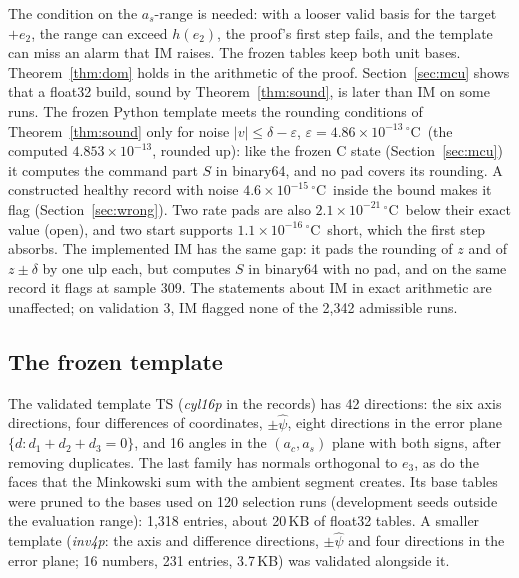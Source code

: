 \documentclass[11pt,a4paper]{article}
\newcommand{\degC}{\ensuremath{{}^\circ}C}
\newcommand{\sci}[2]{\ensuremath{#1\times10^{#2}}}
\begin{document}
The condition on the $a_s$-range is needed: with a looser valid basis for the target $+e_2$, the range can exceed
$h(e_2)$, the proof's first step fails, and the template can miss an alarm that IM raises. The frozen tables keep both
unit bases. Theorem~\ref{thm:dom} holds in the arithmetic of the proof. Section~\ref{sec:mcu} shows that a float32
build, sound by Theorem~\ref{thm:sound}, is later than IM on some runs. The frozen Python template meets the rounding
conditions of Theorem~\ref{thm:sound} only for noise $|v|\le\delta-\varepsilon$, $\varepsilon = \sci{4.86}{-13}$\,\degC\ (the computed \sci{4.853}{-13}, rounded up):
like the frozen C state (Section~\ref{sec:mcu}) it computes the command part $S$ in binary64, and no pad covers its
rounding. A constructed healthy record with noise $\sci{4.6}{-15}$\,\degC\ inside the bound makes it flag
(Section~\ref{sec:wrong}). Two rate pads are also \sci{2.1}{-21}\,\degC\ below their exact value (open), and two start
supports \sci{1.1}{-16}\,\degC\ short, which the first step absorbs. The implemented IM has the same gap: it pads the
rounding of $z$ and of $z\pm\delta$ by one ulp each, but computes $S$ in binary64 with no pad, and on the same record it
flags at sample 309. The statements about IM in exact arithmetic are unaffected; on validation 3, IM flagged none of the
2,342 admissible runs.

\subsection{The frozen template}\label{sec:frozen}

The validated template TS (\emph{cyl16p} in the records) has 42 directions: the six axis directions, four differences of
coordinates, $\pm\hat\psi$, eight directions in the error plane $\{d : d_1+d_2+d_3 = 0\}$, and 16 angles in the
$(a_c, a_s)$ plane with both signs, after removing duplicates. The last family has normals orthogonal to $e_3$, as do
the faces that the Minkowski sum with the ambient segment creates. Its base tables were pruned to the bases used on 120
selection runs (development seeds outside the evaluation range): 1,318 entries, about 20\,KB of float32 tables. A
smaller template (\emph{inv4p}: the axis and difference directions, $\pm\hat\psi$ and four directions in the error plane;
16 numbers, 231 entries, 3.7\,KB) was validated alongside it.
\end{document}
